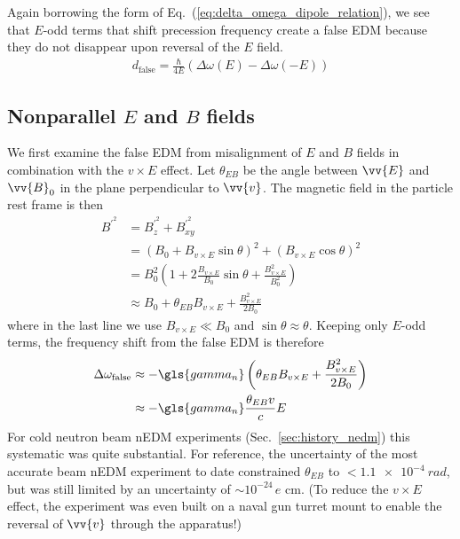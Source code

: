 Again borrowing the form of Eq.~(\ref{eq:delta_omega_dipole_relation}), we see that $E$-odd terms that shift precession frequency create a false EDM because they do not disappear upon reversal of the $E$ field.
%
\begin{gather}
    d_\text{false}=\frac{\hbar}{4E}(\Delta\omega(E)-\Delta\omega(-E))
\end{gather}

\subsection*{
    \texorpdfstring{Nonparallel $E$ and $B$ fields}
                    {Nonparallel E and B fields}
}

We first examine the false EDM from misalignment of $E$ and $B$ fields in combination with the $v\times E$ effect. Let $\theta_{EB}$ be the angle between $\vv{E}$ and $\vv{B}_0$ in the plane perpendicular to $\vv{v}$. The magnetic field in the particle rest frame is then~\cite{lamoreaux_experimental_2009}
%
\begin{align}
    B^{\prime^2} &= B^{\prime^2}_z + B^{\prime^2}_{xy} \\
    &= (B_0 +  B_{v\times E}\sin\theta)^2 + ( B_{v\times E}\cos\theta)^2 \\
    &= B_0^2\left(1 + 2\frac{ B_{v\times E}}{B_0}\sin\theta + \frac{ B_{v\times E}^2}{B_0^2}\right)\\
    &\approx B_0 + \theta_{EB} B_{v\times E} + \frac{B_{v\times E}^2}{2B_0}
\end{align}
%
where in the last line we use $B_{v\times E} \ll B_0$ and $\sin\theta\approx\theta$. Keeping only $E$-odd terms, the frequency shift from the false EDM is therefore
%
\begin{align}
    \Delta\omega_\text{false} &\approx -\gls{gamma_n}\left( \theta_{EB} B_{v\times E} + \frac{B_{v\times E}^2}{2B_0} \right) \label{eq:vxE_motional_shift}\\
    &\approx -\gls{gamma_n} \frac{\theta_{EB}v}{c}E 
\end{align}
%
For cold neutron beam nEDM experiments (Sec.~\ref{sec:history_nedm}) this systematic was quite substantial. For reference, the uncertainty of the most accurate beam nEDM experiment to date \cite{dress_nedm_1977} constrained $\theta_{EB}$ to $<\qty{1.1e-4}{rad}$, but was still limited by an uncertainty of $\sim 10^{-24}\,e\text{ cm}$. (To reduce the $v\times E$ effect, the experiment was even built on a naval gun turret mount to enable the reversal of $\vv{v}$ through the apparatus!) 

